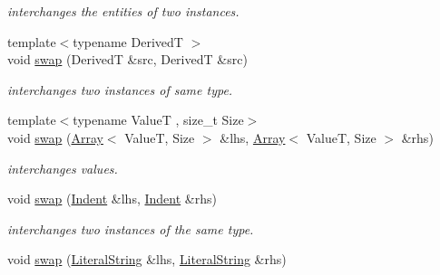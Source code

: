 \begin{DoxyCompactItemize}
\begin{DoxyCompactList}\small\item\em interchanges the entities of two instances. \end{DoxyCompactList}\item 
{\footnotesize template$<$typename Derived\-T $>$ }\\void \hyperlink{namespacehryky_a39d9ffc629490589a9941a892b7073c8}{swap} (Derived\-T \&src, Derived\-T \&src)
\begin{DoxyCompactList}\small\item\em interchanges two instances of same type. \end{DoxyCompactList}\item 
\hypertarget{namespacehryky_a7bca9e1fce78881655d3c9e23dad3691}{{\footnotesize template$<$typename Value\-T , size\-\_\-t Size$>$ }\\void \hyperlink{namespacehryky_a7bca9e1fce78881655d3c9e23dad3691}{swap} (\hyperlink{classhryky_1_1_array}{Array}$<$ Value\-T, Size $>$ \&lhs, \hyperlink{classhryky_1_1_array}{Array}$<$ Value\-T, Size $>$ \&rhs)}\label{namespacehryky_a7bca9e1fce78881655d3c9e23dad3691}

\begin{DoxyCompactList}\small\item\em interchanges values. \end{DoxyCompactList}\item 
\hypertarget{namespacehryky_ac6070836404afc44a0bc502b4b29739b}{void \hyperlink{namespacehryky_ac6070836404afc44a0bc502b4b29739b}{swap} (\hyperlink{classhryky_1_1_indent}{Indent} \&lhs, \hyperlink{classhryky_1_1_indent}{Indent} \&rhs)}\label{namespacehryky_ac6070836404afc44a0bc502b4b29739b}

\begin{DoxyCompactList}\small\item\em interchanges two instances of the same type. \end{DoxyCompactList}\item 
\hypertarget{namespacehryky_a379ab7c2dec49895f0b1362e27f7c9d4}{void \hyperlink{namespacehryky_a379ab7c2dec49895f0b1362e27f7c9d4}{swap} (\hyperlink{classhryky_1_1_literal_string}{Literal\-String} \&lhs, \hyperlink{classhryky_1_1_literal_string}{Literal\-String} \&rhs)}\label{namespacehryky_a379ab7c2dec49895f0b1362e27f7c9d4}


\end{DoxyCompactItemize}

